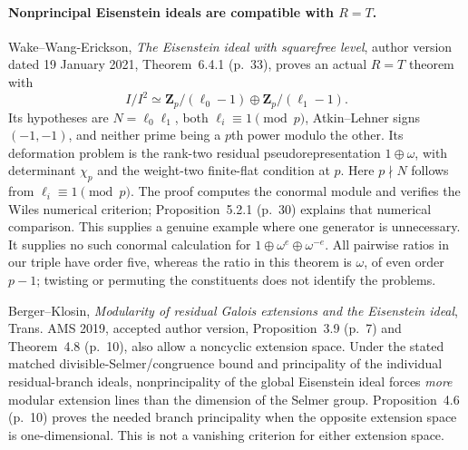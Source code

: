 \paragraph{Nonprincipal Eisenstein ideals are compatible with $R=T$.}
Wake--Wang-Erickson, \emph{The Eisenstein ideal with squarefree
level}, author version dated 19 January 2021,
Theorem~6.4.1 (p.~33), proves an actual $R=T$ theorem with
\[
 I/I^2\simeq
 \mathbf Z_p/(\ell_0-1)\oplus\mathbf Z_p/(\ell_1-1).            \tag{D2.6}
\]
Its hypotheses are $N=\ell_0\ell_1$, both
$\ell_i\equiv1\pmod p$, Atkin--Lehner signs $(-1,-1)$, and
neither prime being a $p$th power modulo the other.  Its
deformation problem is the rank-two residual
pseudorepresentation $1\oplus\omega$, with determinant
$\chi_p$ and the weight-two finite-flat condition at $p$.
Here $p\nmid N$ follows from $\ell_i\equiv1\pmod p$.
The proof computes the conormal module and verifies the
Wiles numerical criterion; Proposition~5.2.1 (p.~30) explains
that numerical comparison.  This supplies a genuine example
where one generator is unnecessary.  It supplies no such
conormal calculation for $1\oplus\omega^e\oplus\omega^{-e}$.
All pairwise ratios in our triple have order five, whereas the
ratio in this theorem is $\omega$, of even order $p-1$; twisting
or permuting the constituents does not identify the problems.

Berger--Klosin, \emph{Modularity of residual Galois extensions
and the Eisenstein ideal}, Trans. AMS 2019, accepted author
version, Proposition~3.9 (p.~7) and Theorem~4.8 (p.~10), also
allow a noncyclic extension space.  Under the stated matched
divisible-Selmer/congruence bound and principality of the
individual residual-branch ideals, nonprincipality of the
global Eisenstein ideal forces \emph{more} modular extension
lines than the dimension of the Selmer group.
Proposition~4.6 (p.~10) proves the needed branch principality
when the opposite extension space is one-dimensional.
This is not a vanishing criterion for either extension space.

